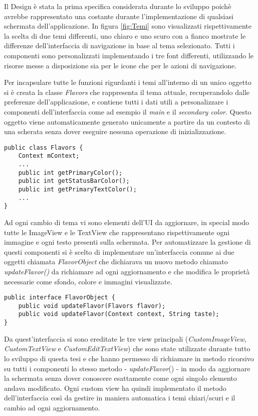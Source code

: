 Il Design è stata la prima specifica considerata durante lo sviluppo
poichè avrebbe rappresentato una costante durante l'implementazione
di qualsiasi schermata dell'applicazione. In figura \ref{fig:Temi}
sono visualizzati rispettivamente la scelta di due temi differenti,
uno chiaro e uno scuro con a fianco mostrate le differenze dell'interfaccia
di navigazione in base al tema selezionato. Tutti i componenti sono
personalizzati implementando i tre font differenti, utilizzando le
risorse messe a disposizione sia per le icone che per le azioni di
navigazione.

Per incapsulare tutte le funzioni rigurdanti i temi all'interno di
un unico oggetto si è creata la classe \emph{Flavors }che rappresenta
il tema attuale, recuperandolo dalle preferenze dell'applicazione,
e contiene tutti i dati utili a personalizzare i componenti dell'interfaccia
come ad esempio il \emph{main} e il \emph{secondary color}. Questo
oggetto viene automaticamente generato unicamente a partire da un
contesto di una scherata senza dover eseguire nessuna operazione di
inizializzazione.

\begin{lstlisting}
public class Flavors {
    Context mContext;
    ...
    public int getPrimaryColor();
    public int getStatusBarColor();
    public int getPrimaryTextColor();
    ...
}
\end{lstlisting}
Ad ogni cambio di tema vi sono elementi dell'UI da aggiornare, in
special modo tutte le ImageView e le TextView che rappresentano rispettivamente
ogni immagine e ogni testo presenti sulla schermata. Per automatizzare
la gestione di questi componenti si è scelto di implementare un'interfaccia
comune ai due oggetti chiamata \emph{FlavorObject} che dichiarava
un nuovo metodo chiamato \emph{updateFlavor()} da richiamare ad ogni
aggiornamento e che modifica le proprietà necessarie come sfondo,
colore e immagini visualizzate.

\begin{lstlisting}
public interface FlavorObject {
    public void updateFlavor(Flavors flavor);
    public void updateFlavor(Context context, String taste);
} 
\end{lstlisting}
Da quest'interfaccia si sono ereditate le tre view principali (\emph{CustomImageView,
CustomTextView }e\emph{ CustomEditTextView}) che sono state utilizzate
durante tutto lo sviluppo di questa tesi e che hanno permesso di richiamare
in metodo ricorsivo su tutti i componenti lo stesso metodo - \emph{updateFlavor}()
- in modo da aggiornare la schermata senza dover conoscere esattamente
come ogni singolo elemento andava modificato. Ogni custom view ha
quindi implementato il metodo dell'interfaccia così da gestire in
maniera automatica i temi chiari/scuri e il cambio ad ogni aggiornamento.

